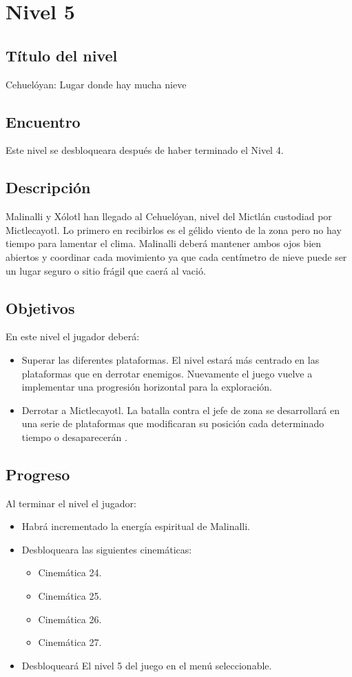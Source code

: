 \section{Nivel 5}
        \subsection{Título del nivel}
        Cehuelóyan: Lugar donde hay mucha nieve
        \subsection{Encuentro}
        Este nivel se desbloqueara después de haber terminado el Nivel 4.
        \subsection{Descripción}
Malinalli y Xólotl han llegado al Cehuelóyan, nivel del Mictlán custodiad por Mictlecayotl. Lo primero en recibirlos es el gélido viento de la zona pero no hay tiempo para lamentar el clima. Malinalli deberá mantener ambos ojos bien abiertos y coordinar cada movimiento ya que cada centímetro de nieve puede ser un lugar seguro o sitio frágil que caerá al vació.      
        \subsection{Objetivos}
En este nivel el jugador deberá:
\begin{itemize}
        \item Superar las diferentes plataformas. El nivel estará más centrado en las plataformas que en derrotar enemigos. Nuevamente el juego vuelve a implementar una progresión horizontal para la exploración. 
        \item  Derrotar a Mictlecayotl. La batalla contra el jefe de zona se desarrollará en una serie de plataformas que modificaran su posición cada determinado tiempo o desaparecerán . 
\end{itemize}


        \subsection{Progreso}
        Al terminar el nivel el jugador:
\begin{itemize}
        \item Habrá incrementado la energía espiritual de Malinalli. 
        \item Desbloqueara las siguientes cinemáticas:
\begin{itemize}
        \item Cinemática 24. 
        \item Cinemática 25.
        \item Cinemática 26.
        \item Cinemática 27.
\end{itemize}
        \item Desbloqueará El nivel 5 del juego en el menú seleccionable.
\end{itemize}

